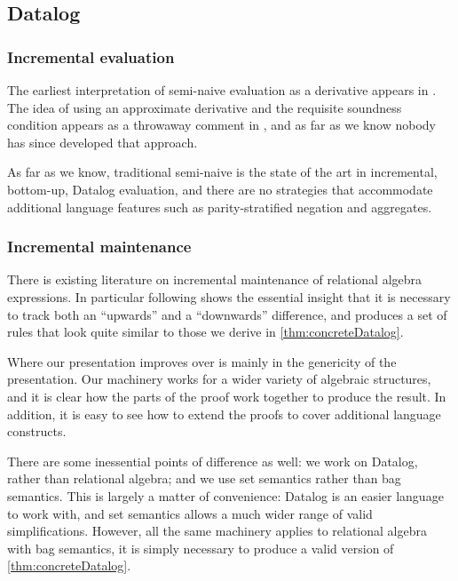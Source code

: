 \subsection{Datalog}

\subsubsection{Incremental evaluation}

The earliest interpretation of semi-naive evaluation as a derivative 
appears in \textcite{bancilhon1986naive}. The idea of using an approximate derivative
and the requisite soundness condition appears as a throwaway comment in
\textcite[][section 3.2.2]{bancilhon1986amateur}, and as far as we know nobody has since
developed that approach.

As far as we know, traditional semi-naive is the state of
the art in incremental, bottom-up, Datalog evaluation, and there are no strategies that
accommodate additional language features such as parity-stratified negation and aggregates.

\subsubsection{Incremental maintenance}

There is existing literature on incremental maintenance of relational algebra
expressions. In particular \textcite{griffin1997improved} following
\textcite{qian1991incremental} shows the essential insight that it is necessary to
track both an ``upwards'' and a ``downwards'' difference, and produces a set of
rules that look quite similar to those we derive in \cref{thm:concreteDatalog}.

Where our presentation improves over \citeauthor{griffin1997improved} is mainly in
the genericity of the presentation. Our machinery works for a wider variety of
algebraic structures, and it is clear how the parts of the proof work together
to produce the result. In addition, it is easy to see how to extend the proofs
to cover additional language constructs.

There are some inessential points of difference as well: we work on Datalog,
rather than relational algebra; and we use set semantics rather than bag
semantics. This is largely a matter of convenience: Datalog is an easier
language to work with, and set semantics allows a much wider range of valid
simplifications. However, all the same machinery applies to relational algebra
with bag semantics, it is simply necessary to produce a valid version of \cref{thm:concreteDatalog}.

